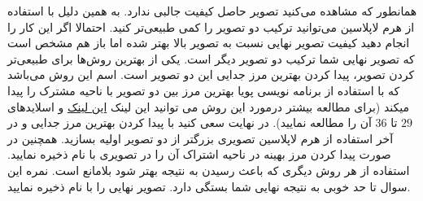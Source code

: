 \documentclass[a4paper]{article}
\begin{document}
همانطور که مشاهده می‌کنید تصویر حاصل کیفیت جالبی ندارد. به همین دلیل با استفاده از هرم لاپلاسین می‌توانید ترکیب دو تصویر را کمی طبیعی‌تر کنید. احتمالا اگر این کار را انجام دهید کیفیت تصویر نهایی نسبت به تصویر بالا بهتر شده اما باز هم مشخص است که تصویر نهایی شما ترکیب دو تصویر دیگر است‌. یکی از بهترین روش‌ها برای طبیعی‌تر کردن تصویر، پیدا کردن بهترین مرز جدایی این دو تصویر است‌. اسم این روش
می‌باشد که با استفاده از برنامه نویسی پویا
بهترین مرز بین دو تصویر با ناحیه مشترک را پیدا میکند (برای مطالعه بیشتر درمورد این روش  می توانید 
این لینک 
\href{https://courses.engr.illinois.edu/cs445/fa2019/lectures/Lecture%2007%20-%20Texture%20Synthesis%20-%20CP%20Fall%202019.pdf}{این لینک}
و اسلاید‌های $ 29 $ تا $ 36 $ آن را مطالعه نمایید). 
در نهایت سعی کنید با پیدا کردن بهترین مرز جدایی و در آخر استفاده از هرم لاپلاسین تصویری بزرگتر از دو تصویر اولیه بسازید‌. همچنین در صورت پیدا کردن مرز بهینه در ناحیه اشتراک آن را در تصویری با نام
 ذخیره نمایید. استفاده از هر روش دیگری که باعث رسیدن به نتیجه بهتر شود بلامانع است. نمره این سوال تا حد خوبی به نتیجه نهایی شما بستگی دارد. 
 تصویر نهایی را با نام 
  ذخیره نمایید. 
\end{document}
